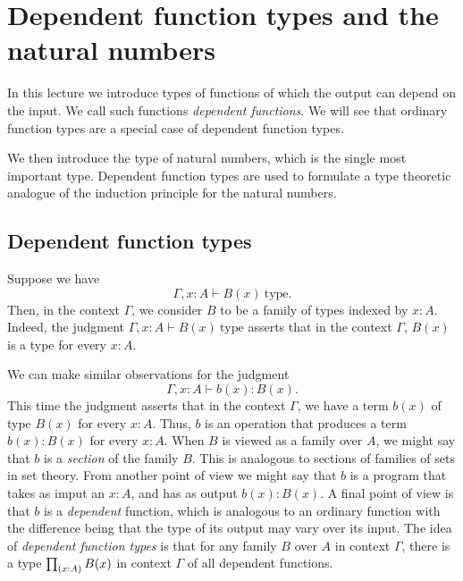 \chapter{Dependent function types and the natural numbers}

In this lecture we introduce types of functions of which the output can depend on the input. We call such functions \emph{dependent functions}. We will see that ordinary function types are a special case of dependent function types.

We then introduce the type of natural numbers, which is the single most important type. Dependent function types are used to formulate a type theoretic analogue of the induction principle for the natural numbers.

\section{Dependent function types}
Suppose we have
\begin{equation*}
  \Gamma,x:A\vdash B(x)~\mathrm{type}.
\end{equation*}
Then, in the context $\Gamma$, we consider $B$ to be a family of types indexed by $x:A$. Indeed, the judgment $\Gamma,x:A\vdash B(x)~\mathrm{type}$ asserts that in the context $\Gamma$, $B(x)$ is a type for every $x:A$.

We can make similar observations for the judgment
\begin{equation*}
  \Gamma,x:A\vdash b(x):B(x).
\end{equation*}
This time the judgment asserts that in the context $\Gamma$, we have a term $b(x)$ of type $B(x)$ for every $x:A$. Thus, $b$ is an operation that produces a term $b(x):B(x)$ for every $x:A$. When $B$ is viewed as a family over $A$, we might say that $b$ is a \emph{section} of the family $B$. This is analogous to sections of families of sets in set theory. From another point of view we might say that $b$ is a program that takes as imput an $x:A$, and has as output $b(x):B(x)$. A final point of view is that $b$ is a \emph{dependent} function, which is analogous to an ordinary function with the difference being that the type of its output may vary over its input. The idea of \emph{dependent function types} is that for any family $B$ over $A$ in context $\Gamma$, there is a type $\prd{x:A}B(x)$ in context $\Gamma$ of all dependent functions.

